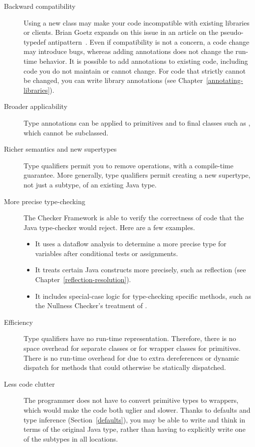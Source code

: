 \begin{description}

\item[Backward compatibility]
Using a new class may make your code incompatible with existing libraries or
clients.  Brian Goetz expands on this issue in an article on the
pseudo-typedef antipattern~\cite{Goetz2006:typedef}.  Even if compatibility
is not a concern, a code change may introduce bugs, whereas adding
annotations does not change the run-time behavior.  It is possible to add
annotations to existing code, including code you do not maintain or cannot
change.  For code that strictly cannot be changed, you
can write library annotations (see Chapter~\ref{annotating-libraries}).

\item[Broader applicability]
Type annotations can be applied to primitives and to final classes such as
, which cannot be subclassed.

\item[Richer semantics and new supertypes]
Type qualifiers permit you to remove operations, with a compile-time
guarantee.  More
generally, type qualifiers permit creating a new supertype, not just a
subtype, of an existing Java type.

\item[More precise type-checking]
The Checker Framework is able to verify the correctness of code that the
Java type-checker would reject.  Here are a few examples.
\begin{itemize}
\item
  It uses a dataflow analysis to determine a more precise type for
  variables after conditional tests or assignments.
\item
  It treats certain Java constructs more precisely, such as
  reflection (see Chapter~\ref{reflection-resolution}).
\item
  It includes special-case logic for type-checking specific methods, such
  as the Nullness Checker's treatment of .
\end{itemize}


\item[Efficiency]
  Type qualifiers have no run-time representation.  Therefore, there is no
  space overhead for separate classes or for wrapper classes for
  primitives.  There is no run-time overhead for due to extra dereferences
  or dynamic dispatch for methods that could otherwise be statically
  dispatched.

\item[Less code clutter]
  The programmer does not have to convert primitive types to wrappers,
  which would make the code both uglier and slower.  Thanks to defaults and
  type inference (Section~\ref{defaults}),
  you may be able to write and think in terms of the
  original Java type, rather than having to explicitly write one of the
  subtypes in all locations.

\end{description}


